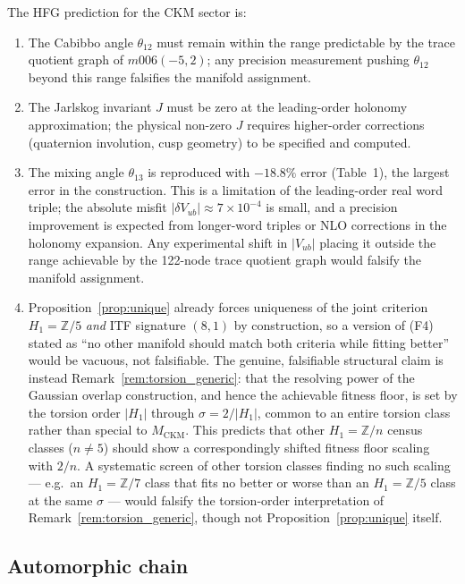 \documentclass[11pt,a4paper]{article}
\theoremstyle{remark}
\newcommand{\MCKM}{M_{\mathrm{CKM}}}
\newcommand{\Zfive}{\mathbb{Z}/5}
\newcommand{\ZZ}{\mathbb{Z}}
\begin{document}
The HFG prediction for the CKM sector is:
\begin{enumerate}[(F1)]
\item The Cabibbo angle $\theta_{12}$ must remain within the range
  predictable by the trace quotient graph of $m006(-5,2)$;
  any precision measurement pushing $\theta_{12}$ beyond this range
  falsifies the manifold assignment.
\item The Jarlskog invariant $J$ must be zero at the leading-order
  holonomy approximation; the physical non-zero $J$ requires
  higher-order corrections (quaternion involution, cusp geometry)
  to be specified and computed.
\item The mixing angle $\theta_{13}$ is reproduced with $-18.8\%$ error
  (Table~1), the largest error in the construction.
  This is a limitation of the leading-order real word triple;
  the absolute misfit $|\delta V_{ub}| \approx 7 \times 10^{-4}$ is small,
  and a precision improvement is expected from longer-word triples or
  NLO corrections in the holonomy expansion.
  Any experimental shift in $|V_{ub}|$ placing it outside the range
  achievable by the 122-node trace quotient graph would falsify the
  manifold assignment.
\item Proposition~\ref{prop:unique} already forces uniqueness of the
  joint criterion $H_1 = \Zfive$ \emph{and} ITF signature $(8,1)$ by
  construction, so a version of (F4) stated as ``no other manifold should
  match both criteria while fitting better'' would be vacuous, not
  falsifiable. The genuine, falsifiable structural claim is instead
  Remark~\ref{rem:torsion_generic}: that the resolving power of the
  Gaussian overlap construction, and hence the achievable fitness floor,
  is set by the torsion order $|H_1|$ through $\sigma = 2/|H_1|$, common
  to an entire torsion class rather than special to $\MCKM$.
  This predicts that other $H_1 = \ZZ/n$ census classes ($n \neq 5$)
  should show a correspondingly shifted fitness floor scaling with
  $2/n$. A systematic screen of other torsion classes finding no such
  scaling --- e.g.\ an $H_1 = \ZZ/7$ class that fits no better or worse
  than an $H_1 = \ZZ/5$ class at the same $\sigma$ --- would falsify the
  torsion-order interpretation of Remark~\ref{rem:torsion_generic}, though
  not Proposition~\ref{prop:unique} itself.
\end{enumerate}

\subsection{Automorphic chain}
\end{document}
